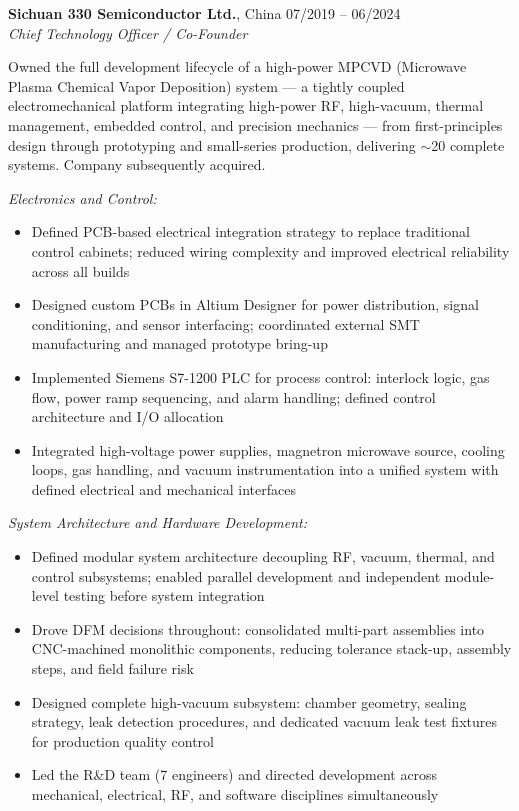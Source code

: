 \documentclass[a4paper,11pt]{article}
\begin{document}
\noindent\textbf{Sichuan 330 Semiconductor Ltd.}, China
\hfill 07/2019 -- 06/2024 \\
\textit{Chief Technology Officer / Co-Founder}

\noindent Owned the full development lifecycle of a high-power MPCVD
(Microwave Plasma Chemical Vapor Deposition) system --- a tightly coupled
electromechanical platform integrating high-power RF, high-vacuum,
thermal management, embedded control, and precision mechanics ---
from first-principles design through prototyping and small-series production,
delivering $\sim$20 complete systems. Company subsequently acquired.

\medskip
\noindent\textit{Electronics and Control:}
\begin{itemize}[noitemsep, topsep=2pt, leftmargin=*]
    \item Defined PCB-based electrical integration strategy to replace
          traditional control cabinets; reduced wiring complexity and
          improved electrical reliability across all builds
    \item Designed custom PCBs in Altium Designer for power distribution,
          signal conditioning, and sensor interfacing; coordinated
          external SMT manufacturing and managed prototype bring-up
    \item Implemented Siemens S7-1200 PLC for process control: interlock
          logic, gas flow, power ramp sequencing, and alarm handling;
          defined control architecture and I/O allocation
    \item Integrated high-voltage power supplies, magnetron microwave source,
          cooling loops, gas handling, and vacuum instrumentation into a
          unified system with defined electrical and mechanical interfaces
\end{itemize}

\medskip
\noindent\textit{System Architecture and Hardware Development:}
\begin{itemize}[noitemsep, topsep=2pt, leftmargin=*]
    \item Defined modular system architecture decoupling RF, vacuum, thermal,
          and control subsystems; enabled parallel development and independent
          module-level testing before system integration
    \item Drove DFM decisions throughout: consolidated multi-part assemblies
          into CNC-machined monolithic components, reducing tolerance
          stack-up, assembly steps, and field failure risk
    \item Designed complete high-vacuum subsystem: chamber geometry, sealing
          strategy, leak detection procedures, and dedicated vacuum leak test
          fixtures for production quality control
    \item Led the R\&D team (7 engineers) and directed development across
          mechanical, electrical, RF, and software disciplines simultaneously
\end{itemize}
\end{document}
